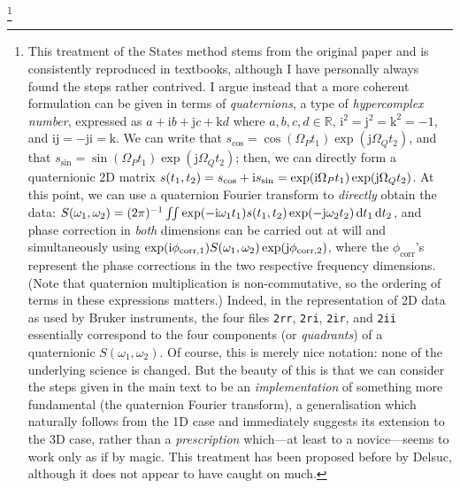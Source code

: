 \footnote{This treatment of the States method stems from the original paper\autocite{States1982JMR} and is consistently reproduced in textbooks, although I have personally always found the steps rather contrived.
    I argue instead that a more coherent formulation can be given in terms of \textit{quaternions}, a type of \textit{hypercomplex number}, expressed as $a + \mathrm{i}b + \mathrm{j}c + \mathrm{k}d$ where $a, b, c, d \in \mathbb{R}$, $\mathrm{i}^2 = \mathrm{j}^2 = \mathrm{k}^2 = -1$, and $\mathrm{ij = -ji = k}$.
    We can write that $s_\text{cos} = \cos(\Omega_P t_1)\exp(\mathrm{j}\Omega_Q t_2)$, and that $s_\text{sin} = \sin(\Omega_P t_1)\exp(\mathrm{j}\Omega_Q t_2)$; then, we can directly form a quaternionic 2D matrix $s(t_1, t_2) = s_\text{cos} + \mathrm{i} s_\text{sin} = \exp(\mathrm{i}\Omega_P t_1)\exp(\mathrm{j}\Omega_Q t_2)$.
    At this point, we can use a quaternion Fourier transform to \textit{directly} obtain the data: $S(\omega_1, \omega_2) = (2\pi)^{-1}\iint \exp(-\mathrm{i}\omega_1 t_1)s(t_1, t_2) \exp(-\mathrm{j}\omega_2 t_2)\,\mathrm{d} t_1\,\mathrm{d} t_2$, and phase correction in \textit{both} dimensions can be carried out at will and simultaneously using
    $\exp(\mathrm{i} \phi_\text{corr,1})S(\omega_1, \omega_2) \exp(\mathrm{j}\phi_\text{corr,2})$, where the $\phi_\text{corr}$'s represent the phase corrections in the two respective frequency dimensions.
    (Note that quaternion multiplication is non-commutative, so the ordering of terms in these expressions matters.)
    Indeed, in the representation of 2D data as used by Bruker instruments, the four files \texttt{2rr}, \texttt{2ri}, \texttt{2ir}, and \texttt{2ii} essentially correspond to the four components (or \textit{quadrants}) of a quaternionic $S(\omega_1, \omega_2)$.
    Of course, this is merely nice notation: none of the underlying science is changed.
    But the beauty of this is that we can consider the steps given in the main text to be an \textit{implementation} of something more fundamental (the quaternion Fourier transform), a generalisation which naturally follows from the 1D case and immediately suggests its extension to the 3D case, rather than a \textit{prescription} which---at least to a novice---seems to work only as if by magic.
    This treatment has been proposed before by Delsuc\autocite{Delsuc1988JMR}, although it does not appear to have caught on much.
}

